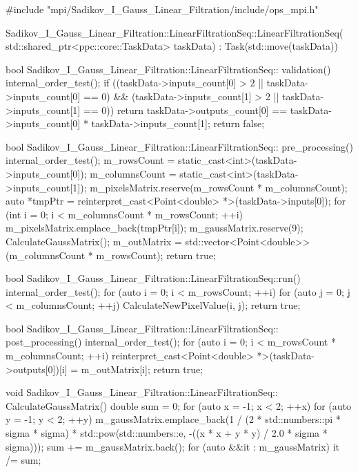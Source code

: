 \documentclass[a4paper,14pt]{report}
\begin{document}
\newpage
\begin{lstlistings}
#include "mpi/Sadikov_I_Gauss_Linear_Filtration/include/ops_mpi.h"

Sadikov_I_Gauss_Linear_Filtration::LinearFiltrationSeq::LinearFiltrationSeq(
    std::shared_ptr<ppc::core::TaskData> taskData)
    : Task(std::move(taskData)) {}

bool Sadikov_I_Gauss_Linear_Filtration::LinearFiltrationSeq::
validation() {
  internal_order_test();
  if ((taskData->inputs_count[0] > 2 || taskData->inputs_count[0] == 0) &&
      (taskData->inputs_count[1] > 2 || taskData->inputs_count[1] == 0)) 
      {
    return taskData->outputs_count[0] == taskData->inputs_count[0]
    * taskData->inputs_count[1];
  }
  return false;
}

bool Sadikov_I_Gauss_Linear_Filtration::LinearFiltrationSeq::
pre_processing() {
  internal_order_test();
  m_rowsCount = static_cast<int>(taskData->inputs_count[0]);
  m_columnsCount = static_cast<int>(taskData->inputs_count[1]);
  m_pixelsMatrix.reserve(m_rowsCount * m_columnsCount);
  auto *tmpPtr = reinterpret_cast<Point<double> *>(taskData->inputs[0]);
  for (int i = 0; i < m_columnsCount * m_rowsCount; ++i) {
    m_pixelsMatrix.emplace_back(tmpPtr[i]);
  }
  m_gaussMatrix.reserve(9);
  CalculateGaussMatrix();
  m_outMatrix = std::vector<Point<double>>(m_columnsCount * m_rowsCount);
  return true;
}

bool Sadikov_I_Gauss_Linear_Filtration::LinearFiltrationSeq::run() {
  internal_order_test();
  for (auto i = 0; i < m_rowsCount; ++i) {
    for (auto j = 0; j < m_columnsCount; ++j) {
      CalculateNewPixelValue(i, j);
    }
  }
  return true;
}

bool Sadikov_I_Gauss_Linear_Filtration::LinearFiltrationSeq::
post_processing() {
  internal_order_test();
  for (auto i = 0; i < m_rowsCount * m_columnsCount; ++i) {
    reinterpret_cast<Point<double> *>(taskData->outputs[0])[i] =
    m_outMatrix[i];
  }
  return true;
}

void Sadikov_I_Gauss_Linear_Filtration::LinearFiltrationSeq::
CalculateGaussMatrix() {
  double sum = 0;
  for (auto x = -1; x < 2; ++x) {
    for (auto y = -1; y < 2; ++y) {
      m_gaussMatrix.emplace_back(1 / (2 * std::numbers::pi * sigma * sigma) *
      std::pow(std::numbers::e, -((x * x + y * y) / 2.0 * sigma * sigma)));
      sum += m_gaussMatrix.back();
    }
  }
  for (auto &&it : m_gaussMatrix) {
    it /= sum;
  }
}


\end{lstlistings}
\end{document}

